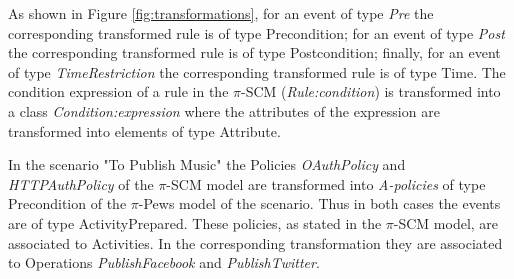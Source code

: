 As shown in Figure \ref{fig:transformations}, for an event of type {\sc\em Pre} the corresponding transformed rule is of type {\sc Precondition}; for an event of type {\sc\em Post} the corresponding transformed rule is of type {\sc Postcondition}; finally, for an event of type {\sc\em TimeRestriction} the corresponding transformed rule is of type {\sc Time}. 
The condition expression of a rule in the $\pi$-SCM ({\sc\em Rule:condition}) is transformed into a class {\sc\em Condition:expression} where the attributes of the expression are transformed into elements of type {\sc Attribute}.



%
In the scenario "To Publish Music" the {\sf Policies} {\em OAuthPolicy} and {\em HTTPAuthPolicy} of the $\pi$-SCM model are transformed into {\em A-policies} of type {\sf Precondition} of the $\pi$-{\sc Pews} model of the scenario. Thus in both cases the events are of type {\sf ActivityPrepared}. These policies, as stated in the $\pi$-SCM model, are associated to {\sf Activities}. In the corresponding transformation they are associated to {\sf Operation}s {\em PublishFacebook} and {\em PublishTwitter}.

